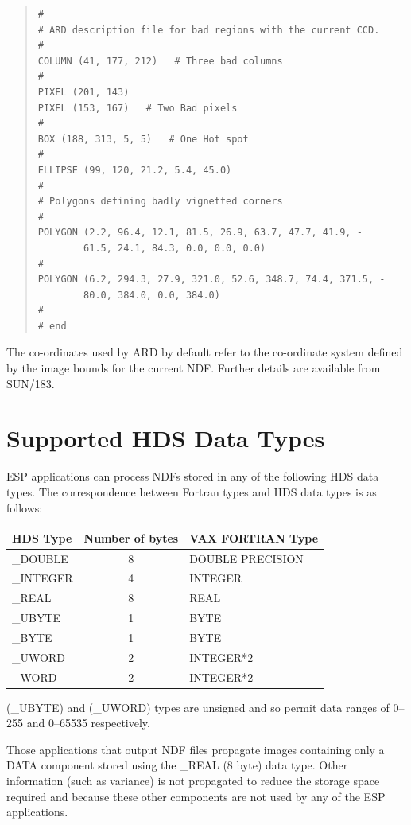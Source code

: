 \documentclass[twoside,11pt]{article}
\newcommand{\xref}[3]{#1}
\newenvironment{myquote}{\begin{quote}\begin{small}}{\end{small}\end{quote}}
\begin{document}
\begin{myquote}
\begin{verbatim}
#
# ARD description file for bad regions with the current CCD.
#
COLUMN (41, 177, 212)   # Three bad columns
#
PIXEL (201, 143)
PIXEL (153, 167)   # Two Bad pixels
#
BOX (188, 313, 5, 5)   # One Hot spot
#
ELLIPSE (99, 120, 21.2, 5.4, 45.0)
#
# Polygons defining badly vignetted corners
#
POLYGON (2.2, 96.4, 12.1, 81.5, 26.9, 63.7, 47.7, 41.9, -
        61.5, 24.1, 84.3, 0.0, 0.0, 0.0)
#
POLYGON (6.2, 294.3, 27.9, 321.0, 52.6, 348.7, 74.4, 371.5, -
        80.0, 384.0, 0.0, 384.0)
#
# end
\end{verbatim}
\end{myquote}

The co-ordinates used by ARD by default refer to the co-ordinate system
defined by the image bounds for the current NDF. Further details are available from
\xref{SUN/183}{sun183}{}.

\newpage
\section{Supported HDS Data Types}
ESP applications can process NDFs stored in any of the
following HDS data types.
The correspondence between Fortran types and HDS data types is as follows:

\begin{center}
\begin{tabular}{|l|c|l|} \hline
{\bf HDS Type} & {\bf Number of bytes} & {\bf VAX FORTRAN Type}\\ \hline
\_DOUBLE & 8 & DOUBLE PRECISION \\
\_INTEGER & 4 & INTEGER \\
\_REAL & 8 & REAL \\
\_UBYTE & 1 & BYTE \\
\_BYTE & 1 & BYTE \\
\_UWORD & 2 & INTEGER*2 \\
\_WORD & 2 & INTEGER*2\\
\hline
\end{tabular}
\end{center}

(\_UBYTE) and (\_UWORD) types are unsigned and so permit data ranges of
0--255 and 0--65535 respectively.

Those applications that output NDF files propagate images containing only
a DATA component stored using the \_REAL (8 byte) data type. Other information
(such as variance) is not propagated to reduce the storage space required and
because these other components are not used by any of the ESP applications.
\end{document}
